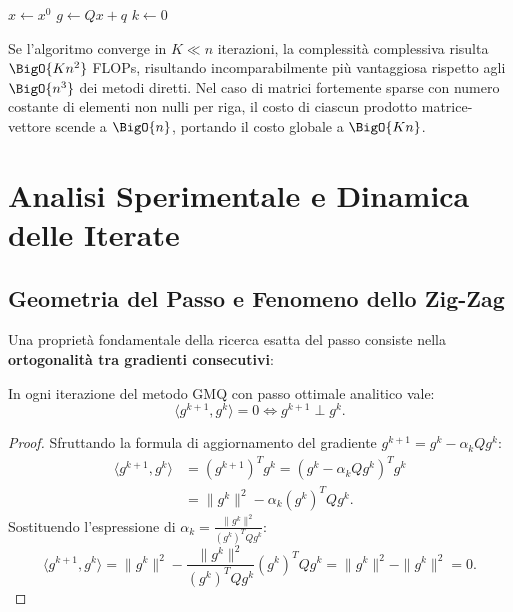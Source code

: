 \begin{algorithm}[H]
\caption{Metodo del Gradiente per Funzioni Quadratiche (GMQ Ottimizzato)}
\label{alg:gmq-ottimizzato}
$x \gets x^0$\;
$g \gets Q x + q$\;
$k \gets 0$\;
\end{algorithm}

Se l'algoritmo converge in $K \ll n$ iterazioni, la complessit\`a complessiva risulta $\BigO{K n^2}$ FLOPs, risultando incomparabilmente pi\`u vantaggiosa rispetto agli $\BigO{n^3}$ dei metodi diretti. Nel caso di matrici fortemente sparse con numero costante di elementi non nulli per riga, il costo di ciascun prodotto matrice-vettore scende a $\BigO{n}$, portando il costo globale a $\BigO{K n}$.


\FloatBarrier
\section{Analisi Sperimentale e Dinamica delle Iterate}
\label{sec:analisi-sperimentale-gmq}

\subsection{Geometria del Passo e Fenomeno dello Zig-Zag}
Una propriet\`a fondamentale della ricerca esatta del passo consiste nella \textbf{ortogonalit\`a tra gradienti consecutivi}:
\begin{proposition}
In ogni iterazione del metodo GMQ con passo ottimale analitico vale:
\begin{equation}
    \langle g^{k+1}, g^k \rangle = 0 \iff g^{k+1} \perp g^k.
\end{equation}
\end{proposition}

\begin{proof}
Sfruttando la formula di aggiornamento del gradiente $g^{k+1} = g^k - \alpha_k Q g^k$:
\begin{align}
    \langle g^{k+1}, g^k \rangle &= (g^{k+1})^T g^k = (g^k - \alpha_k Q g^k)^T g^k \nonumber \\
    &= \|g^k\|^2 - \alpha_k (g^k)^T Q g^k.
\end{align}
Sostituendo l'espressione di $\alpha_k = \frac{\|g^k\|^2}{(g^k)^T Q g^k}$:
\begin{equation}
    \langle g^{k+1}, g^k \rangle = \|g^k\|^2 - \frac{\|g^k\|^2}{(g^k)^T Q g^k} (g^k)^T Q g^k = \|g^k\|^2 - \|g^k\|^2 = 0.
\end{equation}
\end{proof}

